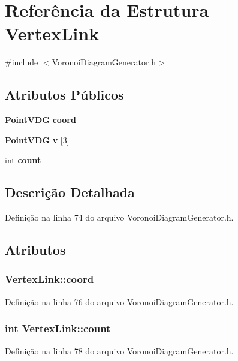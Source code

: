 \section{Referência da Estrutura Vertex\+Link}
\label{struct_vertex_link}


{\ttfamily \#include $<$Voronoi\+Diagram\+Generator.\+h$>$}

\subsection*{Atributos Públicos}
\begin{DoxyCompactItemize}
\item 
{\bf Point\+V\+DG} {\bf coord}
\item 
{\bf Point\+V\+DG} {\bf v} [3]
\item 
int {\bf count}
\end{DoxyCompactItemize}


\subsection{Descrição Detalhada}


Definição na linha 74 do arquivo Voronoi\+Diagram\+Generator.\+h.



\subsection{Atributos}
\subsubsection[{coord}]{ Vertex\+Link\+::coord}\label{struct_vertex_link_a13a58a51a92ca4fedc25e88aaba25681}


Definição na linha 76 do arquivo Voronoi\+Diagram\+Generator.\+h.

\subsubsection[{count}]{\setlength{\rightskip}{0pt plus 5cm}int Vertex\+Link\+::count}\label{struct_vertex_link_a2fa5f9dcb0258af1f0cea8732f22eee1}


Definição na linha 78 do arquivo Voronoi\+Diagram\+Generator.\+h.

